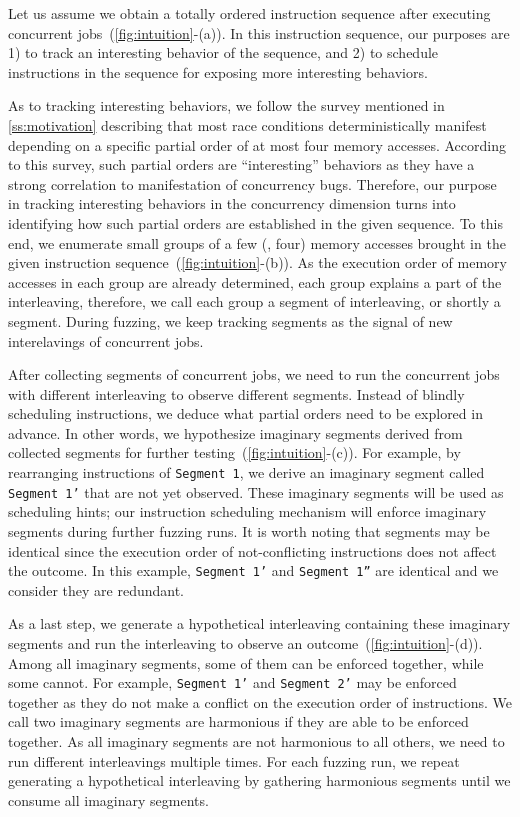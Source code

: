 %
Let us assume we obtain a totally ordered instruction sequence after
executing concurrent jobs~(\autoref{fig:intuition}-(a)).
%
In this instruction sequence, our purposes are 1) to track an
interesting behavior of the sequence, and 2) to schedule instructions
in the sequence for exposing more interesting behaviors.


As to tracking interesting behaviors, we follow the survey mentioned
in \autoref{ss:motivation} describing that most race conditions
deterministically manifest depending on a specific partial order of at
most four memory accesses.
%
According to this survey, such partial orders are ``interesting''
behaviors as they have a strong correlation to manifestation of
concurrency bugs.
%
Therefore, our purpose in tracking interesting behaviors in the
concurrency dimension turns into identifying how such partial orders
are established in the given sequence.
%
To this end, we enumerate small groups of a few (\eg, four) memory
accesses brought in the given instruction
sequence~(\autoref{fig:intuition}-(b)).
%
As the execution order of memory accesses in each group are already
determined, each group explains a part of the interleaving, therefore,
we call each group a segment of interleaving, or shortly a segment.
%
During fuzzing, we keep tracking segments as the signal of new
interelavings of concurrent jobs.





After collecting segments of concurrent jobs, we need to run the
concurrent jobs with different interleaving to observe different
segments.
%
Instead of blindly scheduling instructions, we deduce what partial
orders need to be explored in advance.
%
In other words, we hypothesize imaginary segments derived from
collected segments for further testing~(\autoref{fig:intuition}-(c)).
%
For example, by rearranging instructions of \texttt{Segment 1}, we
derive an imaginary segment called \texttt{Segment 1'} that are not
yet observed.
%
These imaginary segments will be used as scheduling hints; our
instruction scheduling mechanism will enforce imaginary segments
during further fuzzing runs.
%
It is worth noting that segments may be identical since the execution
order of not-conflicting instructions does not affect the outcome.
%
In this example, \texttt{Segment 1'} and \texttt{Segment 1''} are
identical and we consider they are redundant.

As a last step, we generate a hypothetical interleaving containing
these imaginary segments and run the interleaving to observe an
outcome~(\autoref{fig:intuition}-(d)).
%
Among all imaginary segments, some of them can be enforced together,
while some cannot.  For example, \texttt{Segment 1'} and
\texttt{Segment 2'} may be enforced together as they do not make a
conflict on the execution order of instructions.
%
We call two imaginary segments are harmonious if they are able to be
enforced together.
%
As all imaginary segments are not harmonious to all others, we need to
run different interleavings multiple times. For each fuzzing run, we
repeat generating a hypothetical interleaving by gathering harmonious
segments until we consume all imaginary segments.


